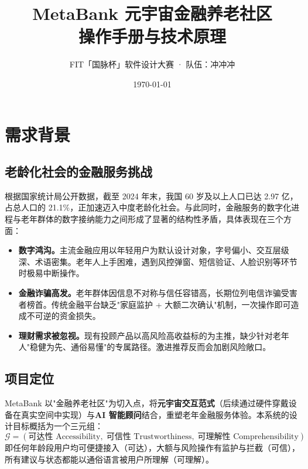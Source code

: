 \documentclass[12pt,a4paper]{article}
\title{\textbf{MetaBank 元宇宙金融养老社区}\\[0.5em]\large 操作手册与技术原理}
\author{FIT「国脉杯」软件设计大赛 · 队伍：冲冲冲}
\date{\today}
\begin{document}
\maketitle

\begin{center}
\end{center}
\vspace{1em}

\tableofcontents
\newpage

\section{需求背景}

\subsection{老龄化社会的金融服务挑战}

根据国家统计局公开数据，截至 2024 年末，我国 60 岁及以上人口已达 2.97 亿，占总人口的 21.1\%，正加速迈入中度老龄化社会。与此同时，金融服务的数字化进程与老年群体的数字接纳能力之间形成了显著的结构性矛盾，具体表现在三个方面：

\begin{itemize}
\item \textbf{数字鸿沟。}主流金融应用以年轻用户为默认设计对象，字号偏小、交互层级深、术语密集。老年人上手困难，遇到风控弹窗、短信验证、人脸识别等环节时极易中断操作。
\item \textbf{金融诈骗高发。}老年群体因信息不对称与信任容错高，长期位列电信诈骗受害者榜首。传统金融平台缺乏"家庭监护 + 大额二次确认"机制，一次操作即可造成不可逆的资金损失。
\item \textbf{理财需求被忽视。}现有投顾产品以高风险高收益标的为主推，缺少针对老年人"稳健为先、通俗易懂"的专属路径。激进推荐反而会加剧风险敞口。
\end{itemize}

\subsection{项目定位}

MetaBank 以"金融养老社区"为切入点，将\textbf{元宇宙交互范式}（后续通过硬件穿戴设备在真实空间中实现）与\textbf{AI 智能顾问}结合，重塑老年金融服务体验。本系统的设计目标概括为一个三元组：
\begin{equation}
\mathcal{G} = (\text{可达性 Accessibility},\; \text{可信性 Trustworthiness},\; \text{可理解性 Comprehensibility})
\end{equation}
即任何年龄段用户均可便捷接入（可达），大额与风险操作有监护与拦截（可信），所有建议与状态都能以通俗语言被用户所理解（可理解）。
\end{document}
